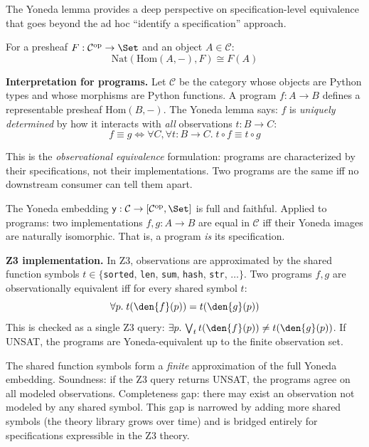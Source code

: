 The Yoneda lemma provides a deep perspective on specification-level
equivalence that goes beyond the ad hoc ``identify a specification''
approach.

\begin{theorem}
For a presheaf $F : \mathcal{C}^{\mathrm{op}} \to \Set$ and an
object $A \in \mathcal{C}$:
\[
  \mathrm{Nat}(\mathrm{Hom}(A, -), F) \cong F(A)
\]
\end{theorem}

\noindent\textbf{Interpretation for programs.}  Let $\mathcal{C}$
be the category whose objects are Python types and whose morphisms
are Python functions.  A program $f : A \to B$ defines a
representable presheaf $\mathrm{Hom}(B, -)$.  The Yoneda lemma
says: $f$ is \emph{uniquely determined} by how it interacts with
\emph{all} observations $t : B \to C$:
\[
  f \equiv g \iff \forall C, \forall t : B \to C.\;
    t \circ f \equiv t \circ g
\]

This is the \emph{observational equivalence} formulation: programs
are characterized by their specifications, not their implementations.
Two programs are the same iff no downstream consumer can tell them
apart.

\begin{corollary}
\label{cor:yoneda-embed}
The Yoneda embedding $\mathsf{y} : \mathcal{C} \to [\mathcal{C}^{\mathrm{op}}, \Set]$
is full and faithful.  Applied to programs: two implementations
$f, g : A \to B$ are equal in $\mathcal{C}$ iff their Yoneda
images are naturally isomorphic.  That is, a program \emph{is}
its specification.
\end{corollary}

\noindent\textbf{Z3 implementation.}
In Z3, observations are approximated by
the shared function symbols $t \in \{$\texttt{sorted}, \texttt{len},
\texttt{sum}, \texttt{hash}, \texttt{str}, $\ldots\}$.  Two programs
$f, g$ are observationally equivalent iff for every shared symbol
$t$:
\[
  \forall p.\; t(\den{f}(p)) = t(\den{g}(p))
\]
This is checked as a single Z3 query: $\exists p.\, \bigvee_t
t(\den{f}(p)) \neq t(\den{g}(p))$.  If UNSAT, the programs are
Yoneda-equivalent up to the finite observation set.

\begin{remark}
The shared function symbols form a \emph{finite} approximation of
the full Yoneda embedding.  Soundness: if the Z3 query returns
UNSAT, the programs agree on all modeled observations.
Completeness gap: there may exist an observation not modeled by
any shared symbol.  This gap is narrowed by adding more shared
symbols (the theory library grows over time) and is bridged entirely
for specifications expressible in the Z3 theory.
\end{remark}

